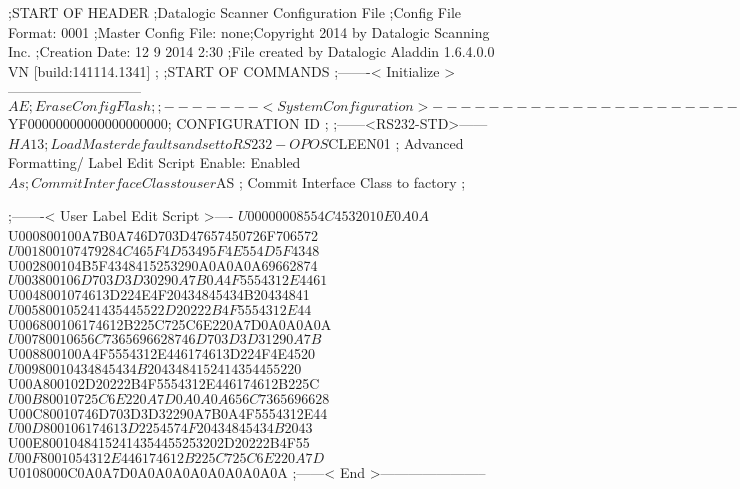 ;START OF HEADER
;Datalogic Scanner Configuration File
;Config File Format: 0001
;Master Config File: none;Copyright 2014 by Datalogic Scanning Inc.
;Creation Date: 12 9 2014 2:30
;File created by Datalogic Aladdin 1.6.4.0.0 VN [build:141114.1341]
;
;START OF COMMANDS
;-------< Initialize >-----------------------------
$AE                 ; Erase Config Flash
;
;-------< System Configuration >-------------------------------
$YF00000000000000000000; CONFIGURATION ID
;
;------<RS232-STD>------
$HA13               ; Load Master defaults and set to RS232-OPOS
$CLEEN01            ; Advanced Formatting/ Label Edit Script Enable: Enabled
$As                 ; Commit Interface Class to user
$AS                 ; Commit Interface Class to factory
;

;-------< User Label Edit Script >----
$U00000008554C4532010E0A0A
$U000800100A7B0A746D703D47657450726F706572
$U001800107479284C465F4D53495F4E554D5F4348
$U002800104B5F4348415253290A0A0A0A69662874
$U003800106D703D3D30290A7B0A4F5554312E4461
$U0048001074613D224E4F20434845434B20434841
$U005800105241435445522D20222B4F5554312E44
$U006800106174612B225C725C6E220A7D0A0A0A0A
$U00780010656C7365696628746D703D3D31290A7B
$U008800100A4F5554312E446174613D224F4E4520
$U00980010434845434B2043484152414354455220
$U00A800102D20222B4F5554312E446174612B225C
$U00B80010725C6E220A7D0A0A0A656C7365696628
$U00C80010746D703D3D32290A7B0A4F5554312E44
$U00D800106174613D2254574F20434845434B2043
$U00E80010484152414354455253202D20222B4F55
$U00F8001054312E446174612B225C725C6E220A7D
$U0108000C0A0A7D0A0A0A0A0A0A0A0A0A
;------< End >-----------------------

